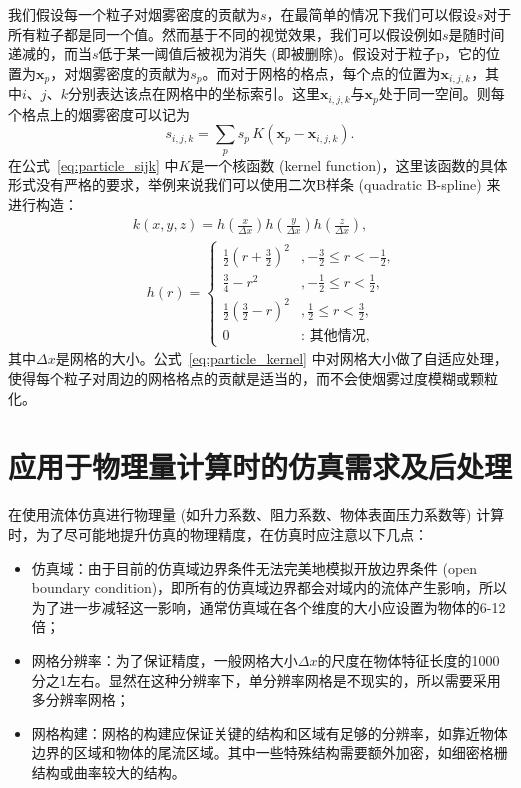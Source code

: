 我们假设每一个粒子对烟雾密度的贡献为$s$，在最简单的情况下我们可以假设$s$对于所有粒子都是同一个值。然而基于不同的视觉效果，我们可以假设例如$s$是随时间递减的，而当$s$低于某一阈值后被视为消失 (即被删除)。假设对于粒子p，它的位置为$\mathbf{x}_p$，对烟雾密度的贡献为$s_p$。而对于网格的格点，每个点的位置为$\mathbf{x}_{i,j,k}$，其中$i$、$j$、$k$分别表达该点在网格中的坐标索引。这里$\mathbf{x}_{i,j,k}$与$\mathbf{x}_p$处于同一空间。则每个格点上的烟雾密度可以记为
\begin{equation}
    s_{i,j,k}=\sum_p s_p \, K(\mathbf{x}_p-\mathbf{x}_{i,j,k}).
    \label{eq:particle_sijk}
\end{equation}
在公式~\ref{eq:particle_sijk} 中$K$是一个核函数 (kernel function)，这里该函数的具体形式没有严格的要求，举例来说我们可以使用二次B样条 (quadratic B-spline) 来进行构造：
\begin{align}
\label{eq:particle_kernel}
& k(x, y, z)= h\left(\frac{x}{\Delta x}\right) h\left(\frac{y}{\Delta x}\right) h\left(\frac{z}{\Delta x}\right), \\
& \quad h(r)=\left\{\begin{array}{cl}
\frac{1}{2}\left(r+\frac{3}{2}\right)^{2} & ,-\frac{3}{2} \leq r<-\frac{1}{2}, \\
\frac{3}{4}-r^{2} & ,-\frac{1}{2} \leq r<\frac{1}{2}, \\
\frac{1}{2}\left(\frac{3}{2}-r\right)^{2} & ,\frac{1}{2} \leq r<\frac{3}{2}, \\
0 & : \text { 其他情况, }
\end{array}\right.
\end{align}
其中$\Delta x$是网格的大小。公式~\ref{eq:particle_kernel} 中对网格大小做了自适应处理，使得每个粒子对周边的网格格点的贡献是适当的，而不会使烟雾过度模糊或颗粒化。

\section{应用于物理量计算时的仿真需求及后处理}
在使用流体仿真进行物理量 (如升力系数、阻力系数、物体表面压力系数等) 计算时，为了尽可能地提升仿真的物理精度，在仿真时应注意以下几点：
\begin{itemize}
    \item 仿真域：由于目前的仿真域边界条件无法完美地模拟开放边界条件 (open boundary condition)，即所有的仿真域边界都会对域内的流体产生影响，所以为了进一步减轻这一影响，通常仿真域在各个维度的大小应设置为物体的6-12倍；
    \item 网格分辨率：为了保证精度，一般网格大小$\Delta x$的尺度在物体特征长度的1000分之1左右。显然在这种分辨率下，单分辨率网格是不现实的，所以需要采用多分辨率网格；
    \item 网格构建：网格的构建应保证关键的结构和区域有足够的分辨率，如靠近物体边界的区域和物体的尾流区域。其中一些特殊结构需要额外加密，如细密格栅结构或曲率较大的结构。
  \end{itemize}

